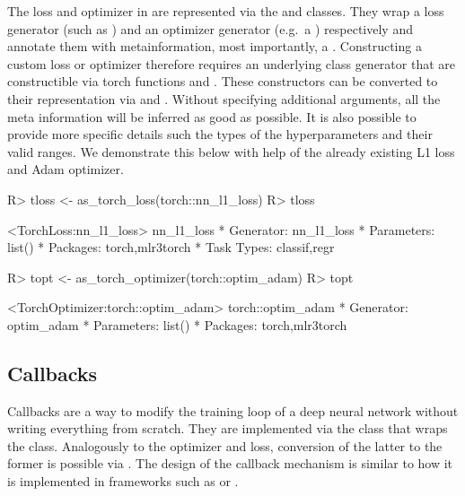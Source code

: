 \documentclass[article]{jss}
\theoremstyle{definition}
\begin{document}
The loss and optimizer in \mlrttorch{} are represented via the  and  classes.
They wrap a loss generator (such as ) and an optimizer generator (e.g.~a ) respectively and annotate them with metainformation, most importantly, a .
Constructing a custom loss or optimizer therefore requires an underlying class generator that are constructible via torch functions  and .
These constructors can be converted to their  representation via  and .
Without specifying additional arguments, all the meta information will be inferred as good as possible.
It is also possible to provide more specific details such the types of the hyperparameters and their valid ranges.
We demonstrate this below with help of the already existing L1 loss and Adam optimizer.

\begin{CodeInput}
R> tloss <- as_torch_loss(torch::nn_l1_loss)
R> tloss
\end{CodeInput}
\begin{CodeOutput}
<TorchLoss:nn_l1_loss> nn_l1_loss
* Generator: nn_l1_loss
* Parameters: list()
* Packages: torch,mlr3torch
* Task Types: classif,regr
\end{CodeOutput}
\begin{CodeInput}
R> topt <- as_torch_optimizer(torch::optim_adam)
R> topt
\end{CodeInput}
\begin{CodeOutput}
<TorchOptimizer:torch::optim_adam> torch::optim_adam
* Generator: optim_adam
* Parameters: list()
* Packages: torch,mlr3torch
\end{CodeOutput}

\begin{CodeInput}
\end{CodeInput}

\subsection{Callbacks}\label{sec:extending-callbacks}

Callbacks are a way to modify the training loop of a deep neural network without writing everything from scratch.
They are implemented via the  class  that wraps the  class.
Analogously to the optimizer and loss, conversion of the latter to the former is possible via .
The design of the callback mechanism is similar to how it is implemented in frameworks such as \keras{} or \luz{} \citep{ref-chollet2018keras, ref-luz2023}.
\end{document}
